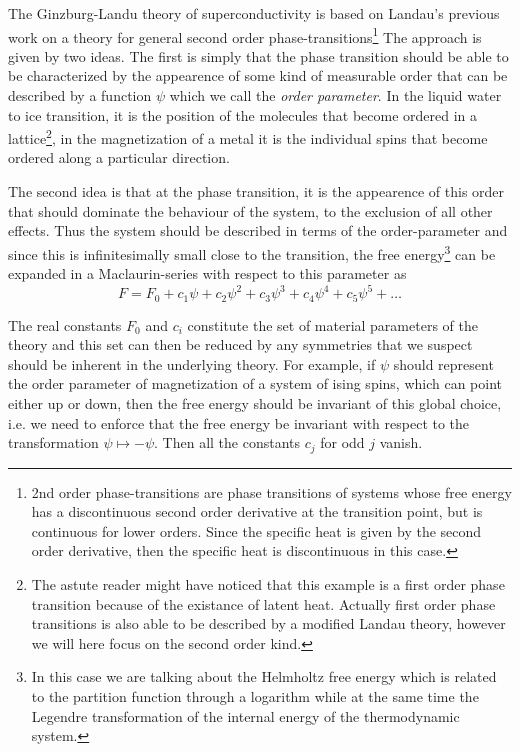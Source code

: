 The Ginzburg-Landu theory of superconductivity is based on Landau's previous work on a theory for general second
order phase-transitions\footnote{2nd order phase-transitions are phase transitions of systems whose free energy
has a discontinuous second order derivative at the transition point, but is continuous for lower orders.
Since the specific heat is given by the second order derivative, then the specific heat is discontinuous in this case.}
The approach is given by two ideas. The first is simply that the phase transition should be able to be characterized
by the appearence of some kind of measurable
order that can be described by a function $\psi$ which we call the \emph{order parameter}. In the liquid water to ice transition,
it is the position of the molecules that become ordered in a lattice\footnote{The astute reader might have noticed that this
example is a first order phase transition because of the existance of latent heat. Actually first order phase transitions
is also able to be described by a modified Landau theory, however we will here focus on the second order kind.},
in the magnetization of a metal it is the individual spins that become ordered along a particular direction.

The second idea is that at the phase transition, it is the appearence of this order that should dominate the behaviour
of the system, to the exclusion of all other effects. Thus the system should be described in terms of the order-parameter
and since this is infinitesimally small close to the transition, the free energy\footnote{In this case we are talking
about the Helmholtz free energy which is related to the partition function through a logarithm while at the same time
the Legendre transformation of the internal energy of the thermodynamic system.} can be expanded in a Maclaurin-series
with respect to this parameter as
\begin{equation}
    \label{eq:statMech:LandauMaclaurin}
    F = F_0 + c_1 \psi + c_2 \psi^2 + c_3 \psi^3 + c_4 \psi^4 + c_5 \psi^5 + \ldots
\end{equation}

The real constants $F_0$ and $c_i$ constitute the set of material parameters of the theory and this set can then
be reduced by any symmetries that we suspect should be inherent in the underlying theory. For example, if $\psi$
should represent the order parameter of magnetization of a system of ising spins, which can point either up or
down, then the free energy should be invariant of this global choice, i.e. we need to enforce that the free energy
be invariant with respect to the transformation $\psi \mapsto -\psi$. Then all the constants $c_j$ for odd $j$
vanish.


